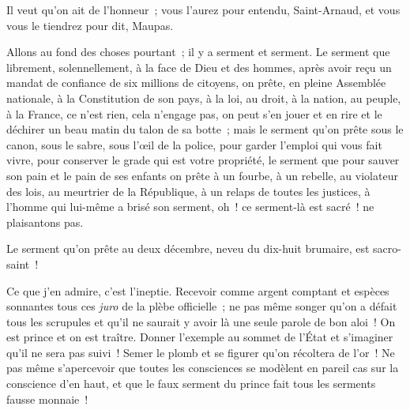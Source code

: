 \documentclass[french,twoside]{book} %
\begin{document}
Il veut qu’on ait de l’honneur ; vous l’aurez pour entendu, Saint-Arnaud, et vous vous le tiendrez pour dit, Maupas.\par
Allons au fond des choses pourtant ; il y a serment et serment. Le serment que librement, solennellement, à la face de Dieu et des hommes, après avoir reçu un mandat de confiance de six millions de citoyens, on prête, en pleine Assemblée nationale, à la Constitution de son pays, à la loi, au droit, à la nation, au peuple, à la France, ce n’est rien, cela n’engage pas, on peut s’en jouer et en rire et le déchirer un beau matin du talon de sa botte ; mais le serment qu’on prête sous le canon, sous le sabre, sous l’œil de la police, pour garder l’emploi qui vous fait vivre, pour conserver le grade qui est votre propriété, le serment que pour sauver son pain et le pain de ses enfants on prête à un fourbe, à un rebelle, au violateur des lois, au meurtrier de la République, à un relaps de toutes les justices, à l’homme qui lui-même a brisé son serment, oh ! ce serment-là est sacré ! ne plaisantons pas.\par
Le serment qu’on prête au deux décembre, neveu du dix-huit brumaire, est sacro-saint !\par
Ce que j’en admire, c’est l’ineptie. Recevoir comme argent comptant et espèces sonnantes tous ces \emph{juro} de la plèbe officielle ; ne pas même songer qu’on a défait tous les scrupules et qu’il ne saurait y avoir là une seule parole de bon aloi ! On est prince et on est traître. Donner l’exemple au sommet de l’État et s’imaginer qu’il ne sera pas suivi ! Semer le plomb et se figurer qu’on récoltera de l’or ! Ne pas même s’apercevoir que toutes les consciences se modèlent en pareil cas sur la conscience d’en haut, et que le faux serment du prince fait tous les serments fausse monnaie !
\end{document}
